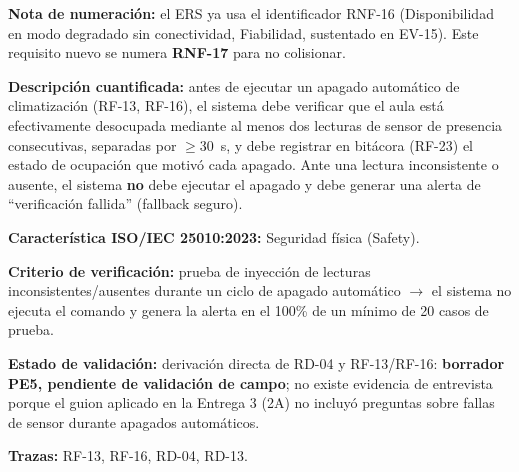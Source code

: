 \textbf{Nota de numeraci\'on:} el ERS ya usa el identificador RNF-16 (Disponibilidad en modo degradado sin conectividad, Fiabilidad, sustentado en EV-15). Este requisito nuevo se numera \textbf{RNF-17} para no colisionar.

\textbf{Descripci\'on cuantificada:} antes de ejecutar un apagado autom\'atico de climatizaci\'on (RF-13, RF-16), el sistema debe verificar que el aula est\'a efectivamente desocupada mediante al menos dos lecturas de sensor de presencia consecutivas, separadas por $\geq$30~s, y debe registrar en bit\'acora (RF-23) el estado de ocupaci\'on que motiv\'o cada apagado. Ante una lectura inconsistente o ausente, el sistema \textbf{no} debe ejecutar el apagado y debe generar una alerta de ``verificaci\'on fallida'' (fallback seguro).

\textbf{Caracter\'istica ISO/IEC 25010:2023:} Seguridad f\'isica (Safety).

\textbf{Criterio de verificaci\'on:} prueba de inyecci\'on de lecturas inconsistentes/ausentes durante un ciclo de apagado autom\'atico $\rightarrow$ el sistema no ejecuta el comando y genera la alerta en el 100\% de un m\'inimo de 20 casos de prueba.

\textbf{Estado de validaci\'on:} derivaci\'on directa de RD-04 y RF-13/RF-16: \textbf{borrador PE5, pendiente de validaci\'on de campo}; no existe evidencia de entrevista porque el guion aplicado en la Entrega 3 (2A) no incluy\'o preguntas sobre fallas de sensor durante apagados autom\'aticos.

\textbf{Trazas:} RF-13, RF-16, RD-04, RD-13.
